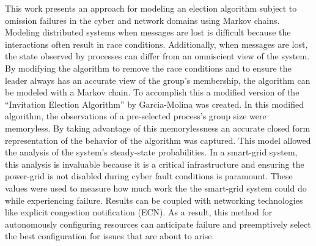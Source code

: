 This work presents an approach for modeling an election algorithm subject to omission failures in the cyber and network domains using Markov chains.
Modeling distributed systems when messages are lost is difficult because the interactions often result in race conditions.
Additionally, when messages are lost, the state observed by processes can differ from an omniscient view of the system.
By modifying the algorithm to remove the race conditions and to ensure the leader always has an accurate view of the group's membership, the algorithm can be modeled with a Markov chain.
To accomplish this a modified version of the ``Invitation Election Algorithm'' by Garcia-Molina was created.
In this modified algorithm, the observations of a pre-selected process's group size were memoryless.
By taking advantage of this memorylessness an accurate closed form representation of the behavior of the algorithm was captured.
This model allowed the analysis of the system's steady-state probabilities.
In a smart-grid system, this analysis is invaluable because it is a critical infrastructure and ensuring the power-grid is not disabled during cyber fault conditions is paramount.
These values were used to measure how much work the the smart-grid system could do while experiencing failure.
Results can be coupled with networking technologies like explicit congestion notification (ECN).
As a result, this method for autonomously configuring resources can anticipate failure and preemptively select the best configuration for issues that are about to arise.

